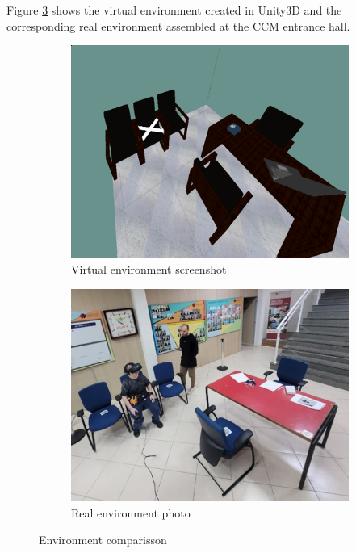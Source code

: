     Figure \ref{fig:ve_re} shows the virtual environment created in Unity3D and the corresponding real environment assembled at the CCM entrance hall. 

    \begin{figure}[!htb]
        \centering
        \begin{subfigure}[b]{0.49\linewidth}
            \centering
            \includegraphics[width=\linewidth]{Metodologia/VE.png}
            \caption{Virtual environment screenshot}
            \label{fig:ve_photo}
        \end{subfigure}
        \hfill
        \begin{subfigure}[b]{0.49\linewidth}
            \centering
            \includegraphics[width=\linewidth]{Metodologia/RE.jpg}
            \caption{Real environment photo}
            \label{fig:re_photo}
        \end{subfigure}
        \caption{Environment comparisson}
        \label{fig:ve_re}
    \end{figure}


